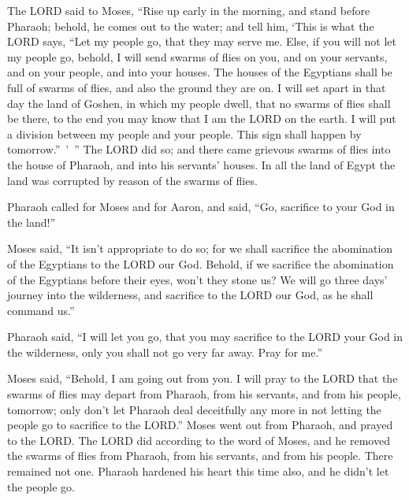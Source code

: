 \myverse{}The LORD said to Moses, “Rise up early in the morning, and stand before Pharaoh; behold, he comes out to the water; and tell him, ‘This is what the LORD says, “Let my people go, that they may serve me. \myverse{}Else, if you will not let my people go, behold, I will send swarms of flies on you, and on your servants, and on your people, and into your houses. The houses of the Egyptians shall be full of swarms of flies, and also the ground they are on. \myverse{}I will set apart in that day the land of Goshen, in which my people dwell, that no swarms of flies shall be there, to the end you may know that I am the LORD on the earth. \myverse{}I will put a division between my people and your people. This sign shall happen by tomorrow.” ’ ” \myverse{}The LORD did so; and there came grievous swarms of flies into the house of Pharaoh, and into his servants’ houses. In all the land of Egypt the land was corrupted by reason of the swarms of flies.


\myverse{}Pharaoh called for Moses and for Aaron, and said, “Go, sacrifice
to your God in the land!”


\myverse{}Moses said, “It isn’t appropriate to do so; for we shall sacrifice the abomination of the Egyptians to the LORD our God. Behold, if we sacrifice the abomination of the Egyptians before their eyes, won’t they stone us? \myverse{}We will go three days’ journey into the wilderness, and sacrifice to the LORD our God, as he shall command us.”


\myverse{}Pharaoh said, “I will let you go, that you may sacrifice to the LORD your God in the wilderness, only you shall not go very far away. Pray for me.”


\myverse{}Moses said, “Behold, I am going out from you. I will pray to the LORD that the swarms of flies may depart from Pharaoh, from his servants, and from his people, tomorrow; only don’t let Pharaoh deal deceitfully any more in not letting the people go to sacrifice to the LORD.” \myverse{}Moses went out from Pharaoh, and prayed to the LORD. \myverse{}The LORD did according to the word of Moses, and he removed the swarms of flies from Pharaoh, from his servants, and from his people. There remained not one. \myverse{}Pharaoh hardened his heart this time also, and he didn’t let the people go.


